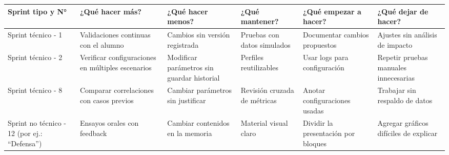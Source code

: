 \documentclass[
11pt, %
codirector, %
]{charter}
\begin{document}
\begin{table}[htpb]
\renewcommand{\arraystretch}{1.4}
\begin{tabular}{|>{\raggedright\arraybackslash}p{1.8cm}|
                >{\raggedright\arraybackslash}p{2.3cm}|
                >{\raggedright\arraybackslash}p{2.3cm}|
                >{\raggedright\arraybackslash}p{2.3cm}|
                >{\raggedright\arraybackslash}p{2.3cm}|
                >{\raggedright\arraybackslash}p{2.3cm}|}
\hline
\rowcolor[HTML]{CCCCCC} 
\textbf{Sprint tipo y N°} & \textbf{¿Qué hacer más?} & \textbf{¿Qué hacer menos?} & \textbf{¿Qué mantener?} & \textbf{¿Qué empezar a hacer?} & \textbf{¿Qué dejar de hacer?} \\
\hline
Sprint técnico - 1 & Validaciones continuas con el alumno & Cambios sin versión registrada & Pruebas con datos simulados & Documentar cambios propuestos & Ajustes sin análisis de impacto \\
\hline
Sprint técnico - 2 & Verificar configuraciones en múltiples escenarios & Modificar parámetros sin guardar historial & Perfiles reutilizables & Usar logs para configuración & Repetir pruebas manuales innecesarias \\
\hline
Sprint técnico - 8 & Comparar correlaciones con casos previos & Cambiar parámetros sin justificar & Revisión cruzada de métricas & Anotar configuraciones usadas & Trabajar sin respaldo de datos \\
\hline
Sprint no técnico - 12 (por ej.: ``Defensa'') & Ensayos orales con feedback & Cambiar contenidos en la memoria & Material visual claro & Dividir la presentación por bloques & Agregar gráficos difíciles de explicar \\
\hline
\end{tabular}
\end{table}
\end{document}
